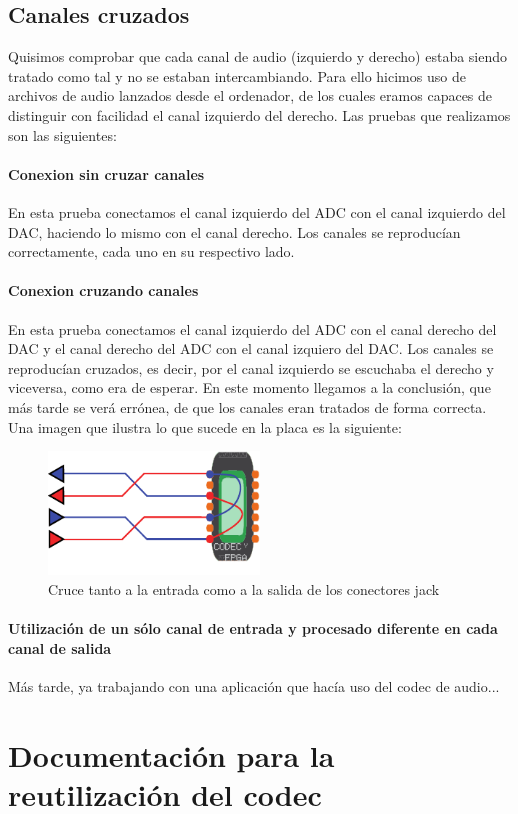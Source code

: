 	

	\subsection{Canales cruzados}

		Quisimos comprobar que cada canal de audio (izquierdo y derecho) estaba siendo tratado como tal y no se estaban intercambiando. Para ello hicimos uso de archivos de audio lanzados desde el ordenador, de los cuales eramos capaces de distinguir con facilidad el canal izquierdo del derecho. Las pruebas que realizamos son las siguientes:

		\paragraph{Conexion sin cruzar canales}
			En esta prueba conectamos el canal izquierdo del ADC con el canal izquierdo del DAC, haciendo lo mismo con el canal derecho. Los canales se reproducían correctamente, cada uno en su respectivo lado.


		\paragraph{Conexion cruzando canales}
			En esta prueba conectamos el canal izquierdo del ADC con el canal derecho del DAC y el canal derecho del ADC con el canal izquiero del DAC. Los canales se reproducían cruzados, es decir, por el canal izquierdo se escuchaba el derecho y viceversa, como era de esperar. En este momento llegamos a la conclusión, que más tarde se verá errónea, de que los canales eran tratados de forma correcta. Una imagen que ilustra lo que sucede en la placa es la siguiente:
\begin{figure}[h]
\begin{center}
	\includegraphics[width=0.5\textwidth]{./swapping_channels-eps-converted-to}
\caption{Cruce tanto a la entrada como a la salida de los conectores jack}
\end{center}
\end{figure}

		\paragraph{Utilización de un sólo canal de entrada y procesado diferente en cada canal de salida}
	
			Más tarde, ya trabajando con una aplicación que hacía uso del codec de audio...
			
		
	
\section{Documentación para la reutilización del codec}
	
